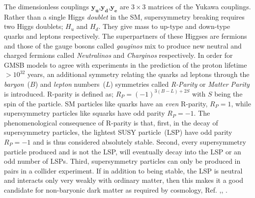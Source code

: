 The dimensionless couplings $\mathbf{y_{u}}$,$\mathbf{y_{d}}$,$\mathbf{y_{e}}$ are $3 \times 3$ matrices of the Yukawa couplings. 
Rather than a single Higgs \textit{doublet} in the SM, supersymmetry breaking requires two Higgs doublets; $H_{u}$ and $H_{d}$. 
They give mass to \textsf{up}-type and \textsf{down}-type quarks and leptons respectively.
The superpartners of these Higgses are fermions and those of the gauge bosons called \textit{gauginos} mix to produce new neutral and charged fermions called \textit{Neutralinos} and \textit{Charginos} respectively.
In order for GMSB models to agree with experiments in the prediction of the proton lifetime $> 10^{32}$ years,
an additional symmetry relating the quarks ad leptons through the \textit{baryon}~($B$) and \textit{lepton} numbers~($L$) symmetries
called \textit{R-Parity} or \textit{Matter Parity} is introduced.
R-parity is defined as; $R_{P} = \left(-1\right)^{3(B-L) + 2S} $ with $S$ being the spin of the particle.
SM particles like quarks have an \textit{even} R-parity, $R_{P} = 1$, while supersymmetry particles like squarks have odd parity $R_{P} = -1$.
The phenomenological consequence of R-parity is that, first, in the decay of supersymmetry particles, the lightest SUSY particle~(LSP) have odd parity $R_{P} =-1$ and is thus considered absolutely stable. Second, every supersymmetry particle produced and is not the LSP, will eventually decay into the LSP or an odd number of LSPs. Third, supersymmetry particles can only be produced in pairs in a collider experiment.
If in addition to being stable, the LSP is neutral and interacts only very weakly with ordinary matter, then this makes it a good candidate for non-baryonic dark matter as required by cosmology, Ref. \cite{SUSYDM},\cite{LSPDM}, \cite{KOlive}.

